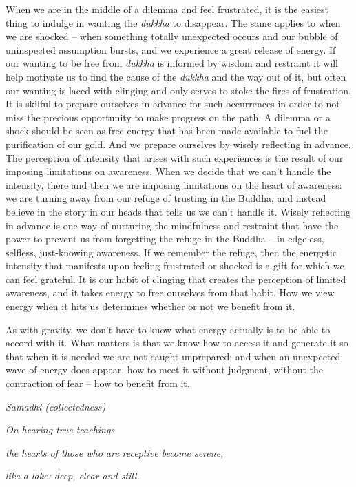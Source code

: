 When we are in the middle of a dilemma and feel frustrated, it is the
easiest thing to indulge in wanting the \emph{dukkha} to disappear. The
same applies to when we are shocked -- when something totally unexpected
occurs and our bubble of uninspected assumption bursts, and we
experience a great release of energy. If our wanting to be free from
\emph{dukkha} is informed by wisdom and restraint it will help motivate
us to find the cause of the \emph{dukkha} and the way out of it, but
often our wanting is laced with clinging and only serves to stoke the
fires of frustration. It is skilful to prepare ourselves in advance for
such occurrences in order to not miss the precious opportunity to make
progress on the path. A dilemma or a shock should be seen as free energy
that has been made available to fuel the purification of our gold. And
we prepare ourselves by wisely reflecting in advance. The perception of
intensity that arises with such experiences is the result of our
imposing limitations on awareness. When we decide that we can't handle
the intensity, there and then we are imposing limitations on the heart
of awareness: we are turning away from our refuge of trusting in the
Buddha, and instead believe in the story in our heads that tells us we
can't handle it. Wisely reflecting in advance is one way of nurturing
the mindfulness and restraint that have the power to prevent us from
forgetting the refuge in the Buddha -- in edgeless, selfless,
just-knowing awareness. If we remember the refuge, then the energetic
intensity that manifests upon feeling frustrated or shocked is a gift
for which we can feel grateful. It is our habit of clinging that creates
the perception of limited awareness, and it takes energy to free
ourselves from that habit. How we view energy when it hits us determines
whether or not we benefit from it.

As with gravity, we don't have to know what energy actually is to be
able to accord with it. What matters is that we know how to access it
and generate it so that when it is needed we are not caught unprepared;
and when an unexpected wave of energy does appear, how to meet it
without judgment, without the contraction of fear -- how to benefit from
it.

\emph{Samadhi (collectedness)}

\emph{On hearing true teachings}

\emph{the hearts of those who are receptive become serene,}

\emph{like a lake: deep, clear and still.}

